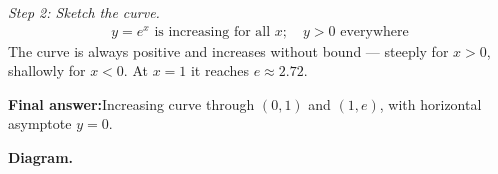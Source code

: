 \documentclass[11pt]{article}
\begin{document}
\textit{Step 2: Sketch the curve.}
\[\begin{gathered}
y = e^{x} \text{ is increasing for all } x; \quad y > 0 \text{ everywhere}
\end{gathered}\]
The curve is always positive and increases without bound --- steeply for \( x > 0 \), shallowly for \( x < 0 \). At \( x = 1 \) it reaches \( e \approx 2.72 \).

\begin{answerbox}
\textbf{Final answer:}\quad Increasing curve through \(\displaystyle (0, 1)\) and \(\displaystyle (1, e)\), with horizontal asymptote \(\displaystyle  y = 0 \).
\end{answerbox}
\textbf{Diagram.}

\begin{center}
\end{center}
\end{document}
